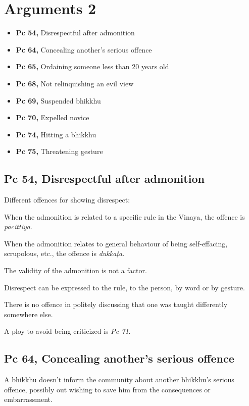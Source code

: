 \chapter{Arguments 2}

\begin{itemize}
\tightlist
\item
  \textbf{Pc 54,} Disrespectful after admonition
\item
  \textbf{Pc 64,} Concealing another's serious offence
\item
  \textbf{Pc 65,} Ordaining someone less than 20 years old
\item
  \textbf{Pc 68,} Not relinquishing an evil view
\item
  \textbf{Pc 69,} Suspended bhikkhu
\item
  \textbf{Pc 70,} Expelled novice
\item
  \textbf{Pc 74,} Hitting a bhikkhu
\item
  \textbf{Pc 75,} Threatening gesture
\end{itemize}

\section{Pc 54, Disrespectful after admonition}

Different offences for showing disrespect:

When the admonition is related to a specific rule in the Vinaya, the
offence is \emph{pācittiya}.

When the admonition relates to general behaviour of being self-effacing,
scrupolous, etc., the offence is \emph{dukkaṭa}.

The validity of the admonition is not a factor.

Disrespect can be expressed to the rule, to the person, by word or by
gesture.

There is no offence in politely discussing that one was taught
differently somewhere else.

A ploy to avoid being criticized is \emph{Pc 71}.

\section{Pc 64, Concealing another's serious offence}

A bhikkhu doesn't inform the community about another bhikkhu's serious
offence, possibly out wishing to save him from the consequences or
embarrassment.

